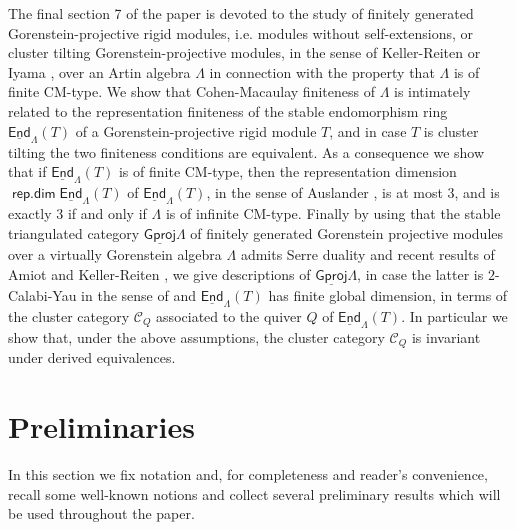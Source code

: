 \documentclass[oneside, a4paper,reqno]{amsart}
\numberwithin{equation}{section}
\theoremstyle{definition}
\begin{document}
The final section 7 of the paper is devoted to the study of finitely
generated Gorenstein-projective rigid modules, i.e. modules without
self-extensions, or cluster tilting Gorenstein-projective modules,
in the sense of Keller-Reiten \cite{KR} or Iyama \cite{Iyama}, over
an Artin algebra $\Lambda$ in connection with the property that
$\Lambda$  is of finite CM-type. We show that Cohen-Macaulay
finiteness of $\Lambda$ is intimately  related to the representation
finiteness of the stable endomorphism ring $\operatorname*{\underline{\mathsf{End}}}_{\Lambda}(T)$ of a
Gorenstein-projective rigid module $T$, and in case $T$ is cluster
tilting the two finiteness conditions are equivalent. As a
consequence we show that if $\operatorname*{\underline{\mathsf{End}}}_{\Lambda}(T)$ is
of finite CM-type, then the representation dimension
$\operatorname*{\mathsf{rep.dim}}\operatorname*{\underline{\mathsf{End}}}_{\Lambda}(T)$ of $\operatorname*{\underline{\mathsf{End}}}_{\Lambda}(T)$, in the sense of
Auslander \cite{Auslander:queen}, is at most $3$, and is exactly $3$ if and only if $\Lambda$
is of infinite CM-type. Finally by using that the stable
triangulated category ${\operatorname{\underline{\mathsf{Gproj}}}\nolimits}\Lambda$ of finitely generated
Gorenstein projective modules over a virtually Gorenstein algebra
$\Lambda$ admits Serre duality \cite{B:cm} and recent results of
Amiot \cite{Amiot} and Keller-Reiten \cite{KR,KR:acyclic}, we give
descriptions of ${\operatorname{\underline{\mathsf{Gproj}}}\nolimits}\Lambda$, in case the latter is
$2$-Calabi-Yau in the sense of \cite{KR} and $\operatorname*{\underline{\mathsf{End}}}_{\Lambda}(T)$
has finite global dimension, in terms of the cluster category
${\mathscr C}_{Q}$ associated to the quiver $Q$ of $\operatorname*{\underline{\mathsf{End}}}_{\Lambda}(T)$. In
particular we show that, under the above assumptions, the cluster
category ${\mathscr C}_{Q}$ is invariant under derived equivalences.

\section{Preliminaries}

In this section we fix notation and, for completeness and reader's
convenience, recall some well-known notions and collect several
preliminary results which will be used throughout the paper.
\end{document}
